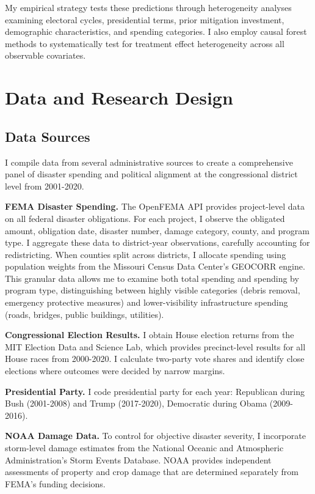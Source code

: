 \documentclass[12pt,letterpaper,oneside]{book}
\begin{document}
My empirical strategy tests these predictions through heterogeneity analyses examining electoral cycles, presidential terms, prior mitigation investment, demographic characteristics, and spending categories. I also employ causal forest methods \citep{wager2018estimation, athey2016recursive} to systematically test for treatment effect heterogeneity across all observable covariates.

\section{Data and Research Design}\label{sec:data}

\subsection{Data Sources}

I compile data from several administrative sources to create a comprehensive panel of disaster spending and political alignment at the congressional district level from 2001-2020.

\textbf{FEMA Disaster Spending.} The OpenFEMA API provides project-level data on all federal disaster obligations. For each project, I observe the obligated amount, obligation date, disaster number, damage category, county, and program type. I aggregate these data to district-year observations, carefully accounting for redistricting. When counties split across districts, I allocate spending using population weights from the Missouri Census Data Center's GEOCORR engine. This granular data allows me to examine both total spending and spending by program type, distinguishing between highly visible categories (debris removal, emergency protective measures) and lower-visibility infrastructure spending (roads, bridges, public buildings, utilities).

\textbf{Congressional Election Results.} I obtain House election returns from the MIT Election Data and Science Lab, which provides precinct-level results for all House races from 2000-2020. I calculate two-party vote shares and identify close elections where outcomes were decided by narrow margins.

\textbf{Presidential Party.} I code presidential party for each year: Republican during Bush (2001-2008) and Trump (2017-2020), Democratic during Obama (2009-2016).

\textbf{NOAA Damage Data.} To control for objective disaster severity, I incorporate storm-level damage estimates from the National Oceanic and Atmospheric Administration's Storm Events Database. NOAA provides independent assessments of property and crop damage that are determined separately from FEMA's funding decisions.
\end{document}
